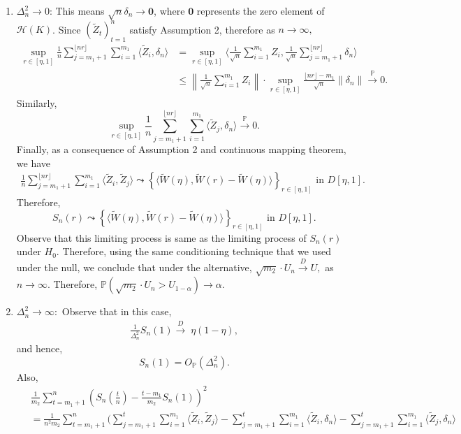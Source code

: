 \documentclass[11pt]{article}
\newcommand{\bP}{\mathbb{P}}
\theoremstyle{plain}
\theoremstyle{definition}
\theoremstyle{remark}
\begin{document}
\begin{appendix}
    \begin{enumerate}
        \item $\Delta_n^2\to 0$: This means $\sqrt{n} \delta_n \to \mathbf{0}$, where $\mathbf{0}$ represents the zero element of $\mathcal{H}(K)$. 
        Since $(\tilde{Z}_t)_{t=1}^{n}$ satisfy Assumption 2, therefore as $n \to \infty,$
   \begin{align*}
       \sup_{r \in [\eta,1]}\frac{1}{n}\sum_{j=m_1+1}^{\lfloor nr \rfloor}\sum_{i=1}^{m_1}\langle \tilde{Z}_i,\delta_n\rangle&=\sup_{r \in [\eta,1]}\langle \frac{1}{\sqrt{n}}\sum_{i=1}^{m_1}Z_i, \frac{1}{\sqrt{n}}\sum_{j=m_1+1}^{\lfloor nr \rfloor} \delta_n \rangle\\
       &\leq \left\|\frac{1}{\sqrt{n}}\sum_{i=1}^{m_1}Z_i \right\|\cdot \sup_{r \in [\eta,1]} \frac{\lfloor nr \rfloor -m_1}{\sqrt{n}}\left\|\delta_n\right\|\overset{\bP}{\to} 0.
   \end{align*}%
    Similarly, 
    $$\sup_{r \in [\eta,1]}\frac{1}{n}\sum_{j=m_1+1}^{\lfloor nr \rfloor}\sum_{i=1}^{m_1}\langle \tilde{Z}_j, \delta_n\rangle \overset{\bP}{\to} 0.$$
    Finally, as a consequence of Assumption 2 and continuous mapping theorem, we have
    \begin{align*}
        \frac{1}{n}\sum_{j=m_1+1}^{\lfloor nr \rfloor}\sum_{i=1}^{m_1} \langle \tilde{Z}_i,\tilde{Z}_j\rangle\leadsto \left\{\langle \tilde{W}(\eta), \tilde{W}(r)-\tilde{W}(\eta)\rangle\right\}_{r \in [\eta,1]} \text{ in } D[\eta,1].
    \end{align*}
    Therefore,
    $$S_n(r)\leadsto \left\{\langle \tilde{W}(\eta), \tilde{W}(r)-\tilde{W}(\eta)\rangle\right\}_{r \in [\eta,1]} \text{ in } D[\eta,1].$$
    Observe that this limiting process is same as the limiting process of $S_n(r)$ under $H_0.$ Therefore, using the same conditioning technique that we used under the null, we conclude that under the alternative, $\sqrt{m_2}\cdot U_n \overset{D}{\to} U,$ as $n \to \infty.$ Therefore, $\bP(\sqrt{m_2}\cdot U_n>U_{1-\alpha})\to \alpha.$
    \item $\Delta_n^2 \to \infty:$ Observe that in this case,
    \begin{align*}
        \frac{1}{\Delta_n^2}S_n(1)\overset{D}{\to}\; \eta (1-\eta),
    \end{align*}
    and hence,
    $$S_n(1)=O_{\bP}(\Delta_n^2).$$
    Also,
    \begin{align*}
        &\frac{1}{m_2}\sum_{t=m_1+1}^n\left(S_n(\frac{t}{n})-\frac{t-m_1}{m_2}S_n(1)\right)^2\\\
        &=\frac{1}{n^2 m_2}\sum_{t=m_1+1}^n\Bigg(\sum_{j=m_1+1}^{t}\sum_{i=1}^{m_1} \langle \tilde{Z}_i,\tilde{Z}_j\rangle-\sum_{j=m_1+1}^{t}\sum_{i=1}^{m_1}\langle \tilde{Z}_i,\delta_n\rangle-\sum_{j=m_1+1}^{t}\sum_{i=1}^{m_1}\langle \tilde{Z}_j, \delta_n\rangle \\

\end{align*}
\end{enumerate}
\end{appendix}
\end{document}

